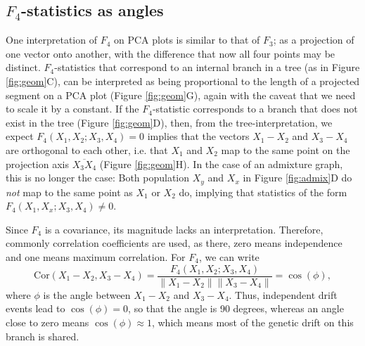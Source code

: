 \documentclass[12pt,fullpage, a4paper]{article}
\newcommand{\norm}[1]{\left\lVert#1\right\rVert}
\begin{document}
\subsection{$F_4$-statistics as angles}
One interpretation of $F_4$ on PCA plots is similar to that of $F_3$; as a projection of one vector onto another, with the difference that now all four points may be distinct. $F_4$-statistics that correspond to an internal branch in a tree (as in Figure \ref{fig:geom}C), can be interpreted as being proportional to the length of a projected segment on a PCA plot (Figure \ref{fig:geom}G), again with the caveat that we need to scale it by a constant. If the $F_4$-statistic corresponds to a branch that does not exist in the tree (Figure \ref{fig:geom}D), then, from the tree-interpretation, we expect $F_4(X_1, X_2; X_3, X_4) = 0$ implies that the vectors $X_1 - X_2$ and $X_3 - X_4$ are orthogonal to each other, i.e. that $X_1$ and $X_2$  map to the same point on the projection axis $\overline{X_3X_4}$ (Figure \ref{fig:geom}H). In the case of an admixture graph, this is no longer the case: Both population $X_y$ and $X_x$ in Figure \ref{fig:admix}D do \emph{not} map to the same point as $X_1$ or $X_2$ do, implying that statistics of the form $F_4(X_1, X_x; X_3, X_4) \neq 0$.


Since $F_4$ is a covariance, its magnitude lacks an interpretation. Therefore, commonly correlation coefficients are used, as there, zero means independence and one means maximum correlation. For $F_4$, we can write 
\begin{equation}
\text{Cor}(X_1 - X_2, X_3 - X_4) =  \frac{F_4( X_1, X_2; X_3, X_4) }{\norm{X_1-X_2}\norm{X_3-X_4}} = \cos(\phi),\label{eq:angle}
\end{equation}
where $\phi$ is the angle between $X_1 - X_2$ and $X_3 - X_4$. Thus, independent drift events lead to $\cos(\phi) = 0$, so that the angle is 90 degrees, whereas an angle close to zero means $\cos(\phi)\approx 1$, which means most of the genetic drift on this branch is shared.
\end{document}
